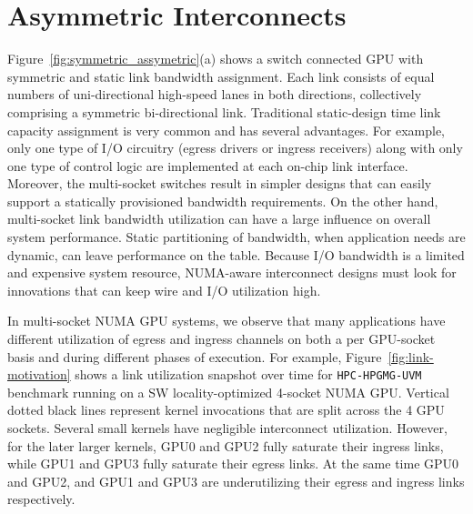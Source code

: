 \section{Asymmetric Interconnects}
\label{sec:interconnect}

Figure~\ref{fig:symmetric_assymetric}(a) shows a switch connected GPU
with symmetric and static link bandwidth assignment.
Each link consists of equal numbers of uni-directional high-speed
lanes in both directions, collectively comprising a symmetric bi-directional
link. Traditional static-design time link capacity assignment is very common and has
several advantages. For example, only one type of I/O circuitry
(egress drivers or ingress receivers) along with only one type of control logic
are implemented at each on-chip link interface. Moreover, the multi-socket
switches result in simpler designs that can easily support a statically provisioned
bandwidth requirements. On the other hand, multi-socket link bandwidth utilization can have
a large influence on overall system performance. Static partitioning of bandwidth,
when application needs are dynamic, can leave performance on the table.
Because I/O bandwidth is a limited and expensive system resource, NUMA-aware
interconnect designs must look for innovations that can keep wire and I/O
utilization high. 

In multi-socket NUMA GPU systems, we observe that many applications have 
different utilization of egress and ingress channels on both a per GPU-socket basis
and during different phases of execution. For example,
Figure~\ref{fig:link-motivation} shows a link utilization snapshot over time for
\texttt{HPC-HPGMG-UVM} benchmark running on a SW locality-optimized 4-socket NUMA GPU. 
Vertical dotted black lines represent
kernel invocations that are split across the 4 GPU sockets. Several small kernels have
negligible interconnect utilization. However, for the later
larger kernels, GPU0 and GPU2 fully saturate their ingress links,
while GPU1 and GPU3 fully saturate their egress links. At the same time GPU0 
and GPU2, and GPU1 and GPU3 are underutilizing their egress and ingress links respectively.

